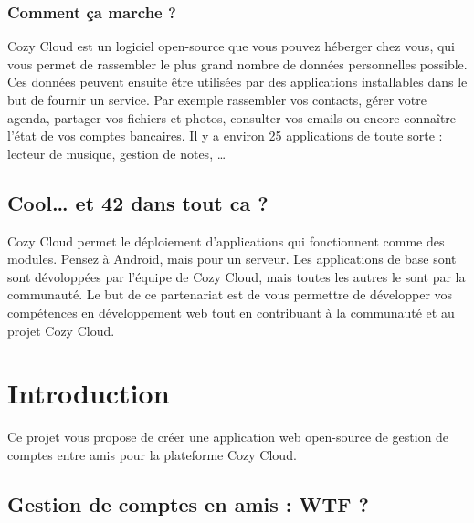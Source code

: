 \documentclass{42-fr}
\begin{document}
		\subsection{Comment ça marche ?}

			Cozy Cloud est un logiciel open-source que vous pouvez h\'eberger chez vous,
			qui vous permet de rassembler le plus grand nombre de donn\'ees
			personnelles possible. Ces donn\'ees peuvent ensuite \^etre utilis\'ees par des
			applications installables dans le but de fournir un service. Par exemple
			rassembler vos contacts, g\'erer votre agenda, partager vos fichiers et
			photos, consulter vos emails ou encore conna\^itre l'état de vos comptes
			bancaires. Il y a environ 25 applications de toute sorte : lecteur de musique,
			gestion de notes, …

	\section{Cool… et 42 dans tout ca ?}

		Cozy Cloud permet le déploiement d'applications qui fonctionnent comme
		des modules. Pensez à Android, mais pour un serveur. Les applications de
		base sont sont d\'evolopp\'ees par l'équipe de Cozy Cloud, mais toutes
		les autres le sont par la communaut\'e. Le but de ce partenariat est de vous
		permettre de d\'evelopper vos comp\'etences en d\'eveloppement web tout
		en contribuant \`a la communaut\'e et au projet Cozy Cloud.


\chapter{Introduction}

	Ce projet vous propose de cr\'eer une application web open-source de gestion de
	comptes entre amis pour la plateforme Cozy Cloud.

	\section{Gestion de comptes en amis : WTF ?}
\end{document}
